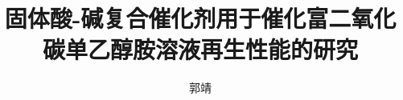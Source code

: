 \documentclass[doctor]{hnuthesis}
\title{固体酸-碱复合催化剂用于催化富二氧化碳单乙醇胺溶液再生性能的研究}
\author{郭靖}
\begin{document}
\maketitle


\tableofcontents
\begingroup
    \renewcommand*{\addvspace}[1]{}
        \listoffigures
        \newpage

        \listoftables
        \newpage
\endgroup

\mainmatter





\appendix


\backmatter



\end{document}
